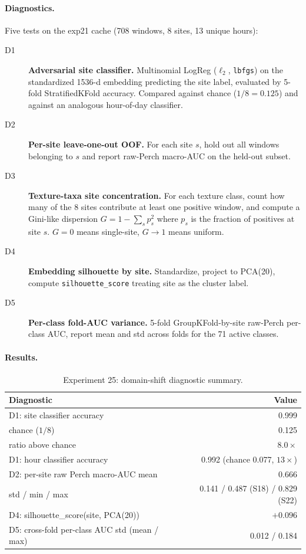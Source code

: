 \paragraph{Diagnostics.}
Five tests on the exp21 cache (708 windows, 8 sites, 13 unique hours):
\begin{description}
\item[D1] \textbf{Adversarial site classifier.} Multinomial LogReg
($\ell_2$, \texttt{lbfgs}) on the standardized 1536-d embedding
predicting the site label, evaluated by 5-fold StratifiedKFold accuracy.
Compared against chance ($1/8 = 0.125$) and against an analogous
hour-of-day classifier.
\item[D2] \textbf{Per-site leave-one-out OOF.} For each site $s$, hold
out all windows belonging to $s$ and report raw-Perch macro-AUC on the
held-out subset.
\item[D3] \textbf{Texture-taxa site concentration.} For each texture
class, count how many of the 8 sites contribute at least one positive
window, and compute a Gini-like dispersion $G = 1 - \sum_s p_s^2$ where
$p_s$ is the fraction of positives at site $s$. $G{=}0$ means
single-site, $G \to 1$ means uniform.
\item[D4] \textbf{Embedding silhouette by site.} Standardize, project to
PCA(20), compute \texttt{silhouette\_score} treating site as the cluster
label.
\item[D5] \textbf{Per-class fold-AUC variance.} 5-fold GroupKFold-by-site
raw-Perch per-class AUC, report mean and std across folds for the 71
active classes.
\end{description}

\paragraph{Results.}

\begin{table}[h]
\centering
\caption{Experiment 25: domain-shift diagnostic summary.}
\label{tab:exp25}
\begin{tabular}{lr}
\hline
\textbf{Diagnostic} & \textbf{Value} \\
\hline
D1: site classifier accuracy           & 0.999 \\
\quad chance ($1/8$)                   & 0.125 \\
\quad ratio above chance               & $\boldsymbol{8.0\times}$ \\
D1: hour classifier accuracy           & 0.992 (chance 0.077, $13\times$) \\
D2: per-site raw Perch macro-AUC mean  & 0.666 \\
\quad std / min / max                  & 0.141 / 0.487 (S18) / 0.829 (S22) \\
D4: silhouette\_score(site, PCA(20))   & $+0.096$ \\
D5: cross-fold per-class AUC std (mean / max) & 0.012 / 0.184 \\
\hline
\end{tabular}
\end{table}

